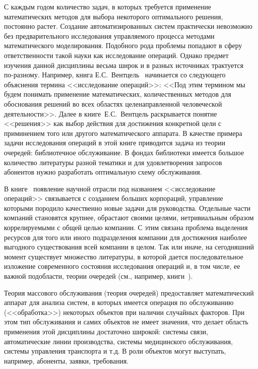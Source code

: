 С каждым годом количество задач, в которых требуется применение математических методов для выбора некоторого оптимального решения, постоянно растет. Создание автоматизированных систем практически невозможно без предварительного исследования управляемого процесса методами математического моделирования. Подобного рода проблемы попадают в сферу ответственности такой науки как исследование операций. Однако предмет изучения данной дисциплины весьма широк и в разных источниках трактуется по-разному. Например, книга Е.С.~Вентцель~\cite{Ventcel} начинается со следующего объяснения термина <<исследование операций>>: <<Под этим термином мы будем понимать применение математических, количественных методов для обоснования решений во всех областях целенаправленной человеческой деятельности>>. Далее в книге~Е.С.~Вентцель раскрывается понятие <<решения>> как выбор действия для достижения конкретной цели с приминением того или другого математического аппарата. В качестве примера задачи исследования операций в этой книге приводится задача из теории очередей: библиотечное обслуживание. В фондах библиотеки имеется большое количество литературы разной тематики и для удовлетворения запросов абонентов нужно разработать оптимальную схему обслуживания.

В книге~\cite{Hillier} появление научной отрасли под названием  <<исследование операций>>  связывается с созданием больших корпораций, управление которыми породило качественно новые задачи для руководства. Отдельные части компаний становятся крупнее, обрастают своими целями, нетривиальным образом коррелируемыми с общей целью компании. С этим связана проблема выделения ресурсов для того или иного подразделения компании для достижения наиболее выгодного существования всей компании в целом. Так или иначе, на сегодняшний момент существует множество литературы, в которой дается последовательное изложение современного состояния исследования операций и, в том числе, ее важной подобласти, теории очередей (см., например, книги~\cite{Taha, Carter, Murthy, Hillier, Encylc, Ventcel, Eltarenko}).

Теория массового обслуживания (теория очередей) предоставляет математический аппарат для анализа систем, в которых имеется операция по обслуживанию (<<обработка>>) некоторых объектов при наличии случайных факторов. При этом тип обслуживания и самих объектов не имеет значения, что делает область применения этой дисциплины достаточно широкой: системы связи, автоматические линии производства, системы медицинского обслуживания, системы управления транспорта и т.д.  В роли объектов могут выступать, например, абоненты, заявки, требования.

